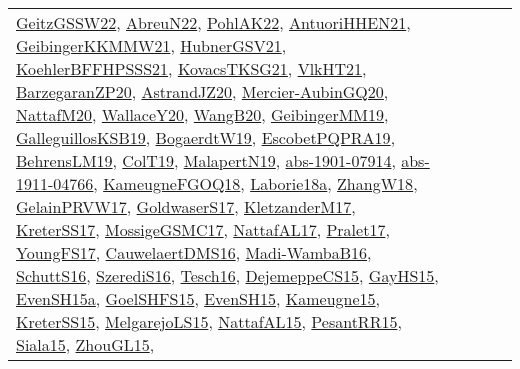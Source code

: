 {\begin{longtable}{lp{3cm}>{\raggedright}p{6cm}>{\raggedright}p{6cm}p{8cm}}
\href{papers/GeitzGSSW22.pdf}{GeitzGSSW22}\cite{GeitzGSSW22}, \href{articles/AbreuN22.pdf}{AbreuN22}\cite{AbreuN22}, \href{articles/PohlAK22.pdf}{PohlAK22}\cite{PohlAK22}, \href{papers/AntuoriHHEN21.pdf}{AntuoriHHEN21}\cite{AntuoriHHEN21}, \href{papers/GeibingerKKMMW21.pdf}{GeibingerKKMMW21}\cite{GeibingerKKMMW21}, \href{articles/HubnerGSV21.pdf}{HubnerGSV21}\cite{HubnerGSV21}, \href{articles/KoehlerBFFHPSSS21.pdf}{KoehlerBFFHPSSS21}\cite{KoehlerBFFHPSSS21}, \href{papers/KovacsTKSG21.pdf}{KovacsTKSG21}\cite{KovacsTKSG21}, \href{articles/VlkHT21.pdf}{VlkHT21}\cite{VlkHT21}, \href{papers/BarzegaranZP20.pdf}{BarzegaranZP20}\cite{BarzegaranZP20}, \href{articles/AstrandJZ20.pdf}{AstrandJZ20}\cite{AstrandJZ20}, \href{papers/Mercier-AubinGQ20.pdf}{Mercier-AubinGQ20}\cite{Mercier-AubinGQ20}, \href{papers/NattafM20.pdf}{NattafM20}\cite{NattafM20}, \href{articles/WallaceY20.pdf}{WallaceY20}\cite{WallaceY20}, \href{papers/WangB20.pdf}{WangB20}\cite{WangB20}, \href{papers/GeibingerMM19.pdf}{GeibingerMM19}\cite{GeibingerMM19}, \href{papers/GalleguillosKSB19.pdf}{GalleguillosKSB19}\cite{GalleguillosKSB19}, \href{papers/BogaerdtW19.pdf}{BogaerdtW19}\cite{BogaerdtW19}, \href{articles/EscobetPQPRA19.pdf}{EscobetPQPRA19}\cite{EscobetPQPRA19}, \href{papers/BehrensLM19.pdf}{BehrensLM19}\cite{BehrensLM19}, \href{papers/ColT19.pdf}{ColT19}\cite{ColT19}, \href{papers/MalapertN19.pdf}{MalapertN19}\cite{MalapertN19}, \href{articles/abs-1901-07914.pdf}{abs-1901-07914}\cite{abs-1901-07914}, \href{articles/abs-1911-04766.pdf}{abs-1911-04766}\cite{abs-1911-04766}, \href{papers/KameugneFGOQ18.pdf}{KameugneFGOQ18}\cite{KameugneFGOQ18}, \href{papers/Laborie18a.pdf}{Laborie18a}\cite{Laborie18a}, \href{articles/ZhangW18.pdf}{ZhangW18}\cite{ZhangW18}, \href{papers/GelainPRVW17.pdf}{GelainPRVW17}\cite{GelainPRVW17}, \href{papers/GoldwaserS17.pdf}{GoldwaserS17}\cite{GoldwaserS17}, \href{papers/KletzanderM17.pdf}{KletzanderM17}\cite{KletzanderM17}, \href{articles/KreterSS17.pdf}{KreterSS17}\cite{KreterSS17}, \href{papers/MossigeGSMC17.pdf}{MossigeGSMC17}\cite{MossigeGSMC17}, \href{articles/NattafAL17.pdf}{NattafAL17}\cite{NattafAL17}, \href{papers/Pralet17.pdf}{Pralet17}\cite{Pralet17}, \href{papers/YoungFS17.pdf}{YoungFS17}\cite{YoungFS17}, \href{papers/CauwelaertDMS16.pdf}{CauwelaertDMS16}\cite{CauwelaertDMS16}, \href{papers/Madi-WambaB16.pdf}{Madi-WambaB16}\cite{Madi-WambaB16}, \href{papers/SchuttS16.pdf}{SchuttS16}\cite{SchuttS16}, \href{papers/SzerediS16.pdf}{SzerediS16}\cite{SzerediS16}, \href{papers/Tesch16.pdf}{Tesch16}\cite{Tesch16}, \href{papers/DejemeppeCS15.pdf}{DejemeppeCS15}\cite{DejemeppeCS15}, \href{papers/GayHS15.pdf}{GayHS15}\cite{GayHS15}, \href{articles/EvenSH15a.pdf}{EvenSH15a}\cite{EvenSH15a}, \href{articles/GoelSHFS15.pdf}{GoelSHFS15}\cite{GoelSHFS15}, \href{papers/EvenSH15.pdf}{EvenSH15}\cite{EvenSH15}, \href{articles/Kameugne15.pdf}{Kameugne15}\cite{Kameugne15}, \href{papers/KreterSS15.pdf}{KreterSS15}\cite{KreterSS15}, \href{papers/MelgarejoLS15.pdf}{MelgarejoLS15}\cite{MelgarejoLS15}, \href{articles/NattafAL15.pdf}{NattafAL15}\cite{NattafAL15}, \href{papers/PesantRR15.pdf}{PesantRR15}\cite{PesantRR15}, \href{articles/Siala15.pdf}{Siala15}\cite{Siala15}, \href{papers/ZhouGL15.pdf}{ZhouGL15}\cite{ZhouGL15}, 
\end{longtable}}
